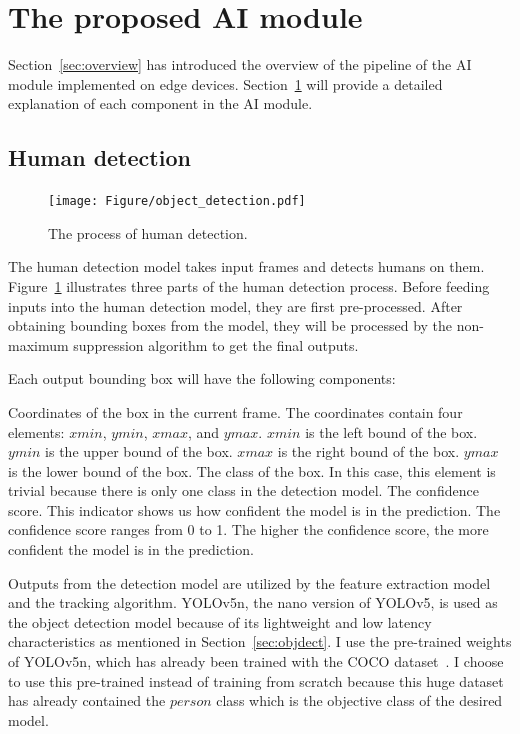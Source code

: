 \documentclass[../main.tex]{subfiles}
\begin{document}
\section{The proposed AI module}
\label{sec:flow}

Section~\ref{sec:overview} has introduced the overview of the pipeline of the AI module implemented on edge devices. Section~\ref{sec:flow} will provide a detailed explanation of each component in the AI module.

\subsection{Human detection}
\label{subsec:hudect}

\begin{figure}[h!]
\centering
\texttt{[image: Figure/object\_detection.pdf]}
\caption{The process of human detection.}
\label{fig:detect_result}
\end{figure}

The human detection model takes input frames and detects humans on them. Figure~\ref{fig:detect_result} illustrates three parts of the human detection process. Before feeding inputs into the human detection model, they are first pre-processed. After obtaining bounding boxes from the model, they will be processed by the non-maximum suppression algorithm to get the final outputs.

Each output bounding box will have the following components:
\begin{outline}
 \1 Coordinates of the box in the current frame. The coordinates contain four elements: $xmin$, $ymin$, $xmax$, and $ymax$.
    \2 $xmin$ is the left bound of the box.
    \2 $ymin$ is the upper bound of the box.
    \2 $xmax$ is the right bound of the box.
    \2 $ymax$ is the lower bound of the box.
 \1 The class of the box. In this case, this element is trivial because there is only one class in the detection model.
 \1 The confidence score. This indicator shows us how confident the model is in the prediction. The confidence score ranges from 0 to 1. The higher the confidence score, the more confident the model is in the prediction.
\end{outline}

Outputs from the detection model are utilized by the feature extraction model and the tracking algorithm. YOLOv5n, the nano version of YOLOv5, is used as the object detection model because of its lightweight and low latency characteristics as mentioned in Section~\ref{sec:objdect}. I use the pre-trained weights of YOLOv5n, which has already been trained with the COCO dataset~\cite{lin2014microsoft}. I choose to use this pre-trained instead of training from scratch because this huge dataset has already contained the $person$ class which is the objective class of the desired model.
\end{document}
